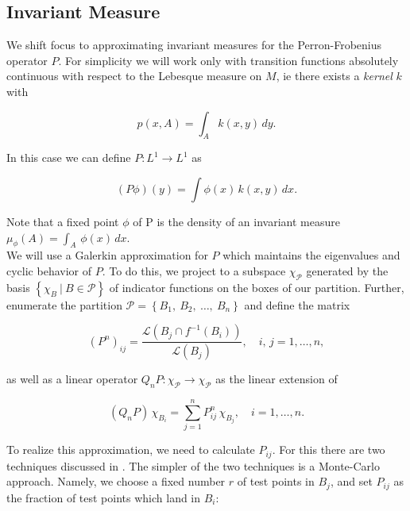 
\subsection{Invariant Measure}

We shift focus to approximating invariant measures for the Perron-Frobenius operator $P$.
For simplicity we will work only with transition functions absolutely continuous with 
respect to the Lebesque measure on $M$, ie there exists a \emph{kernel} $k$ with 

\begin{equation}
    \label{eq:kernel}
    p(x, A) = \int_A k(x, y)\, dy.
\end{equation}

In this case we can define $P: L^1 \to L^1$ as 

\begin{equation}
    (P \phi)(y) = \int \phi (x)\, k(x, y)\, dx.
\end{equation}

Note that a fixed point $\phi$ of P is the density of an invariant measure 
$\mu_\phi (A) = \int_A\, \phi(x)\, dx$. \\

We will use a Galerkin approximation for $P$ which maintains the eigenvalues and cyclic 
behavior of $P$. To do this, we project to a subspace 
$\chi_{\mathcal{P}}$ generated by the basis $\left\{ \chi_B\ \vert\ B \in \mathcal{P} \right\}$ 
of indicator functions on the boxes of our partition. Further, enumerate the partition 
$\mathcal{P} = \left\{ B_1,\ B_2,\ \ldots,\ B_n \right\}$ and define the matrix 

\begin{equation}
    \label{eq:pij}
    (P^n)_{ij} = \frac{\mathcal{L}\left(B_j \cap f^{-1}(B_i)\right)}{\mathcal{L}(B_j)}, 
    \quad i,\, j = 1, \ldots, n,
\end{equation}

as well as a linear operator $Q_n P : \chi_{\mathcal{P}} \to \chi_{\mathcal{P}}$ as 
the linear extension of 

\begin{equation}
    \label{eq:qnp}
    (Q_n P)\, \chi_{B_i} = \sum_{j = 1}^n P_{ij}^n\, \chi_{B_j}, \quad i = 1, \ldots, n.
\end{equation}

To realize this approximation, we need to calculate $P_{ij}$. For this there are two 
techniques discussed in \cite*{algGAIO}. The simpler of the two techniques is a 
Monte-Carlo approach. Namely, we choose a fixed number $r$ of test points in 
$B_j$, and set $P_{ij}$ as the fraction of test points which land in $B_i$:

